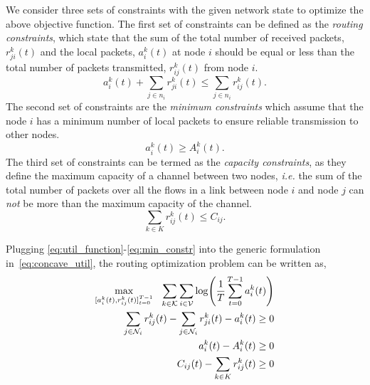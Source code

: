 \documentclass[lettersize,journal]{IEEEtran}
\begin{document}
We consider three sets of constraints with the given network state to optimize the above objective function. The first set of constraints can be defined as the \textit{routing constraints}, which state that the sum of the total number of received packets, $r_{ji}^k(t)$ and the local packets, $a_i^k(t)$ at node $i$ should be equal or less than the total number of packets transmitted, $r_{ij}^k(t)$ from node $i$. 
\begin{equation} \label{eq:flow_constr}
    a_i^k(t) + \sum_{j \in n_i} r_{ji}^k(t) \leq \sum_{j \in n_i} r_{ij}^k(t).
\end{equation}
The second set of constraints are the \textit{minimum constraints} which assume that the node $i$ has a minimum number of local packets to ensure reliable transmission to other nodes.
\begin{equation} \label{eq:cap_constr}
    a_i^k(t) \geq A_i^k(t).
\end{equation}
The third set of constraints can be termed as the \textit{capacity constraints}, as they define the maximum capacity of a channel between two nodes, \textit{i.e.} the sum of the total number of packets over all the flows in a link between node $i$ and node $j$ can \emph{not} be more than the maximum capacity of the channel.
\begin{equation} \label{eq:min_constr}
    \sum_{k \in K} r_{ij}^k(t) \leq C_{ij}.
\end{equation}

Plugging %
\eqref{eq:util_function}-\eqref{eq:min_constr} into the generic formulation in~\eqref{eq:concave_util}, the routing optimization problem can be written as,
\begin{subequations} \label{eq:prob_state}
\begin{align}
    \max_{[a_i^k(t), r_{ij}^k(t)]_{t=0}^{T-1}} \hspace{0.25cm}  \sum_{k \in \mathcal{K}} \sum_{i \in \mathcal{V}} \log \Biggl(\frac{1}{T} \sum_{t=0}^{T-1} a_i^k(t)\Biggl) \label{eq:7a} \\
    \sum_{j \in \mathcal{N}_i} r_{ij}^k(t) - \sum_{j \in \mathcal{N}_i} r_{ji}^k(t) - a_i^k(t) \geq 0 \label{eq:7b} \\
    a_i^k(t) - A_i^k(t) \geq 0 \label{eq:7c} \\
    C_{ij}(t) - \sum_{k \in K} r_{ij}^k(t) \geq 0 \label{eq:7d} 
\end{align}
\end{subequations}
\end{document}
